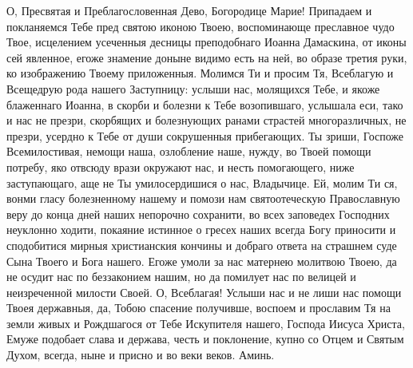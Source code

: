 \begin{mymulticols}
О, Пресвятая и Преблагословенная Дево, Богородице Марие! Припадаем и покланяемся Тебе пред святою иконою Твоею, воспоминающе преславное чудо Твое, исцелением усеченныя десницы преподобнаго Иоанна Дамаскина, от иконы сей явленное, егоже знамение доныне видимо есть на ней, во образе третия руки, ко изображению Твоему приложенныя. Молимся Ти и просим Тя, Всеблагую и Всещедрую рода нашего Заступницу: услыши нас, молящихся Тебе, и якоже блаженнаго Иоанна, в скорби и болезни к Тебе возопившаго, услышала еси, тако и нас не презри, скорбящих и болезнующих ранами страстей многоразличных, не презри, усердно к Тебе от души сокрушенныя прибегающих. Ты зриши, Госпоже Всемилостивая, немощи наша, озлобление наше, нужду, во Твоей помощи потребу, яко отвсюду врази окружают нас, и несть помогающего, ниже заступающаго, аще не Ты умилосердишися о нас, Владычице. Ей, молим Ти ся, вонми гласу болезненному нашему и помози нам святоотеческую Православную веру до конца дней наших непорочно сохранити, во всех заповедех Господних неуклонно ходити, покаяние истинное о гресех наших всегда Богу приносити и сподобитися мирныя христианския кончины и добраго ответа на страшнем суде Сына Твоего и Бога нашего. Егоже умоли за нас матернею молитвою Твоею, да не осудит нас по беззаконием нашим, но да помилует нас по велицей и неизреченной милости Своей. О, Всеблагая! Услыши нас и не лиши нас помощи Твоея державныя, да, Тобою спасение получивше, воспоем и прославим Тя на земли живых и Рождшагося от Тебе Искупителя нашего, Господа Иисуса Христа, Емуже подобает слава и держава, честь и поклонение, купно со Отцем и Святым Духом, всегда, ныне и присно и во веки веков. Аминь.

\end{mymulticols}

\mychapterending

